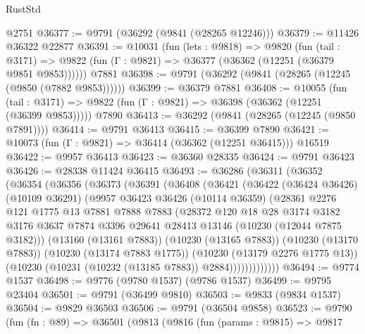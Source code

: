 \begin{lexlean}{RustStd}
\begin{coremodule}
    @2751
@36377 := @9791 (@36292 (@9841 (@28265 @12246)))
@36379 := @11426 @36322 @22877
@36391 := @10031
    (fun (lets : @9818) =>
    @9820
      (fun (tail : @3171) =>
      @9822 (fun (Γ : @9821) => @36377 (@36362 (@12251 (@36379 @9851 @9853))))))
    @7881
@36398 := @9791 (@36292 (@9841 (@28265 (@12245 (@9850 (@7882 @9853))))))
@36399 := @36379 @7881
@36408 := @10055
    (fun (tail : @3171) => @9822 (fun (Γ : @9821) => @36398 (@36362 (@12251 (@36399 @9853)))))
    @7890
@36413 := @36292 (@9841 (@28265 (@12245 (@9850 @7891))))
@36414 := @9791 @36413
@36415 := @36399 @7890
@36421 := @10073 (fun (Γ : @9821) => @36414 (@36362 (@12251 @36415))) @16519
@36422 := @9957 @36413
@36423 := @36360 @28335
@36424 := @9791 @36423
@36426 := @28338 @11424 @36415
@36493 := @36286
    (@36311
      (@36352
        (@36354
          (@36356
            (@36373
              (@36391
                (@36408
                  (@36421
                    (@36422
                      (@36424 @36426)
                      (@10109 @36291)
                      (@9957
                        @36423
                        @36426
                        (@10114 @36359)
                        (@28361
                          @2276
                          @121
                          @1775
                          @13
                          @7881
                          @7888
                          @7883
                          (@28372
                            @120
                            @18
                            @28
                            @3174
                            @3182
                            @3176
                            @3637
                            @7874
                            @3396
                            @29641
                            @28413
                            @13146
                            (@10230 (@12044 @7875 @3182)))
                          (@13160 (@13161 @7883))
                          (@10230 (@13165 @7883))
                          (@10230 (@13170 @7883))
                          (@10230 (@13174 @7883 @1775))
                          (@10230 (@13179 @2276 @1775 @13))
                          (@10230 (@10231 (@10232 (@13185 @7883)) @2884)))))))))))))
@36494 := @9774 @1537
@36498 := @9776 (@9780 @1537) (@9786 @1537)
@36499 := @9795 @23404
@36501 := @9791 (@36499 @9810)
@36503 := @9833 (@9834 @1537)
@36504 := @9829 @36503
@36506 := @9791 (@36504 @9858)
@36523 := @9790
    (fun (fn : @89) =>
    @36501
      (@9813
        (@9816
          (fun (params : @9815) =>
          @9817

\end{coremodule}
\end{lexlean}
